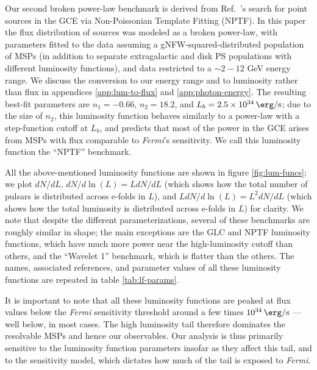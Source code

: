 \documentclass[letter,11pt]{article}
\begin{document}
Our second broken power-law benchmark is derived from Ref.~\cite{Lee:2015fea}'s search for point sources in the GCE via Non-Poissonian Template Fitting (NPTF). In this paper the flux distribution of sources was modeled as a broken power-law, with parameters fitted to the data assuming a gNFW-squared-distributed population of MSPs (in addition to separate extragalactic and disk PS populations with different luminosity functions), and data restricted to a $\sim 2-12$ GeV energy range. We discuss the conversion to our energy range and to luminosity rather than flux in appendices \ref{app:lum-to-flux} and \ref{app:photon-energy}. The resulting best-fit parameters are $n_1=-0.66$, $n_2=18.2$, and $L_b = \SI{2.5e+34}{\erg\per\second}$; due to the size of $n_2$, this luminosity function behaves similarly to a power-law with a step-function cutoff at $L_b$, and predicts that most of the power in the GCE arises from MSPs with flux comparable to \textit{Fermi}'s sensitivity. We call this luminosity function the ``NPTF'' benchmark.

All the above-mentioned luminosity functions are shown in figure \ref{fig:lum-funcs}; we plot $dN/dL$, $dN/d\ln(L) = L dN /dL$ (which shows how the total number of pulsars is distributed across e-folds in $L$), and $L dN /d\ln(L)=L^2 dN/dL$ (which shows how the total luminosity is distributed across e-folds in $L$) for clarity.
We note that despite the different parameterizations, several of these benchmarks are roughly similar in shape; the main exceptions are the GLC and NPTF luminosity functions, which have much more power near the high-luminosity cutoff than others, and the ``Wavelet 1'' benchmark, which is flatter than the others. The names, associated references, and parameter values of all these luminosity functions are repeated in table \ref{tab:lf-params}.

It is important to note that all these luminosity functions are peaked at flux values below the \textit{Fermi} sensitivity threshold around a few times $\SI{e34}{\erg\per\second}$ --- well below, in most cases. The high luminosity tail therefore dominates the resolvable MSPs and hence our observables. Our analysis is thus primarily sensitive to the luminosity function parameters insofar as they affect this tail, and to the sensitivity model, which dictates how much of the tail is exposed to \textit{Fermi}.
\end{document}
